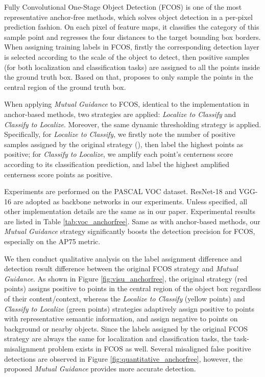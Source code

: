 \documentclass[runningheads]{llncs}
\begin{document}
Fully Convolutional One-Stage Object Detection (FCOS) \cite{FCOS} is one of the most representative anchor-free methods, which solves object detection in a per-pixel prediction fashion. On each pixel of feature maps, it classifies the category of this sample point and regresses the four distances to the target bounding box borders.
When assigning training labels in FCOS, firstly the corresponding detection layer is selected according to the scale of the object to detect, then positive samples (for both localization and classification tasks) are assigned to all the points inside the ground truth box.
Based on that, \cite{FCOS_PLUS} proposes to only sample the points in the central region of the ground truth box.

When applying \emph{Mutual Guidance} to FCOS, identical to the implementation in anchor-based methods, two strategies are applied: \emph{Localize to Classify} and \emph{Classify to Localize}. Moreover, the same dynamic thresholding strategy is applied. Specifically, for \emph{Localize to Classify}, we firstly note the number of positive samples assigned by the original strategy (), then label the  highest  points as positive; for \emph{Classify to Localize}, we amplify each point's centerness score according to its classification prediction, and label the  highest amplified centerness score points as positive. 

Experiments are performed on the PASCAL VOC dataset. ResNet-18 \cite{ResNet} and VGG-16 \cite{VGG} are adopted as backbone networks in our experiments. Unless specified, all other implementation details are the same as in our paper. Experimental results are listed in Table \ref{tab:voc_anchorfree}. Same as with anchor-based methods, our \emph{Mutual Guidance} strategy significantly boosts the detection precision for FCOS, especially on the AP75 metric.

We then conduct qualitative analysis on the label assignment difference and detection result difference between the original FCOS strategy and \emph{Mutual Guidance}. 
As shown in  Figure \ref{fig:visu_anchorfree}, the original strategy (red points) assigns positive to points in the central region of the object box regardless of their content/context, whereas the \emph{Localize to Classify} (yellow points) and \emph{Classify to Localize} (green points) strategies adaptively assign positive to points with representative semantic information, and assign negative to points on background or nearby objects. 
Since the labels assigned by the original FCOS strategy are always the same for localization and classification tasks, the task-misalignment problem exists in FCOS as well. Several misaligned false positive detections are observed in Figure \ref{fig:quantitative_anchorfree}, however, the proposed \emph{Mutual Guidance} provides more accurate detection.
\end{document}

